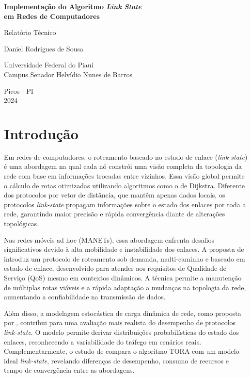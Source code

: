 \documentclass[12pt,a4paper]{report}
\begin{document}
\begin{titlepage}
\begin{center}
    \vspace*{2cm}
    {\Huge\textbf{Implementação do Algoritmo \textit{Link State}\\em Redes de Computadores}}
    
    \vspace{2cm}
    {\Large Relatório Técnico}
    
    \vspace{4cm}
    {\Large Daniel Rodrigues de Sousa}
    
    \vspace{1cm}
    {\large Universidade Federal do Piauí\\
    Campus Senador Helvídio Nunes de Barros}
    
    \vfill
    {\large Picos - PI\\
    2024}
\end{center}
\end{titlepage}

\chapter{Introdução}

Em redes de computadores, o roteamento baseado no estado de enlace (\textit{link-state}) é uma abordagem na qual cada nó constrói uma visão completa da topologia da rede com base em informações trocadas entre vizinhos. Essa visão global permite o cálculo de rotas otimizadas utilizando algoritmos como o de Dijkstra. Diferente dos protocolos por vetor de distância, que mantêm apenas dados locais, os protocolos \textit{link-state} propagam informações sobre o estado dos enlaces por toda a rede, garantindo maior precisão e rápida convergência diante de alterações topológicas.

Nas redes móveis ad hoc (MANETs), essa abordagem enfrenta desafios significativos devido à alta mobilidade e instabilidade dos enlaces. A proposta de \cite{chen2004demand} introduz um protocolo de roteamento sob demanda, multi-caminho e baseado em estado de enlace, desenvolvido para atender aos requisitos de Qualidade de Serviço (QoS) mesmo em contextos dinâmicos. A técnica permite a manutenção de múltiplas rotas viáveis e a rápida adaptação a mudanças na topologia da rede, aumentando a confiabilidade na transmissão de dados.

Além disso, a modelagem estocástica de carga dinâmica de rede, como proposta por \cite{osorio2011dynamic}, contribui para uma avaliação mais realista do desempenho de protocolos \textit{link-state}. O modelo permite derivar distribuições probabilísticas do estado dos enlaces, reconhecendo a variabilidade do tráfego em cenários reais. Complementarmente, o estudo de \cite{park1998performance} compara o algoritmo TORA com um modelo ideal \textit{link-state}, revelando diferenças de desempenho, consumo de recursos e tempo de convergência entre as abordagens.
\end{document}
